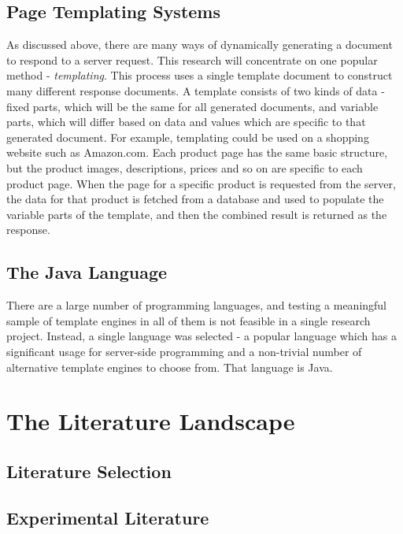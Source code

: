 \subsection{Page Templating Systems}

As discussed above, there are many ways of dynamically generating a document to respond to a server request. This research will concentrate on one popular method - \emph{templating}. This process uses a single template document to construct many different response documents. A template consists of two kinds of data - fixed parts, which will be the same for all generated documents, and variable parts, which will differ based on data and values which are specific to that generated document. For example, templating could be used on a shopping website such as Amazon.com. Each product page has the same basic structure, but the product images, descriptions, prices and so on are specific to each product page. When the page for a specific product is requested from the server, the data for that product is fetched from a database and used to populate the variable parts of the template, and then the combined result is returned as the response.

\subsection{The Java Language}

There are a large number of programming languages, and testing a meaningful sample of template engines in all of them is not feasible in a single research project. Instead, a single language was selected - a popular language which has a significant usage for server-side programming  and a non-trivial number of alternative template engines to choose from. That language is Java.

\section{The Literature Landscape}
\label{section:literature landscape}


\subsection{Literature Selection}

\subsection{Experimental Literature}

